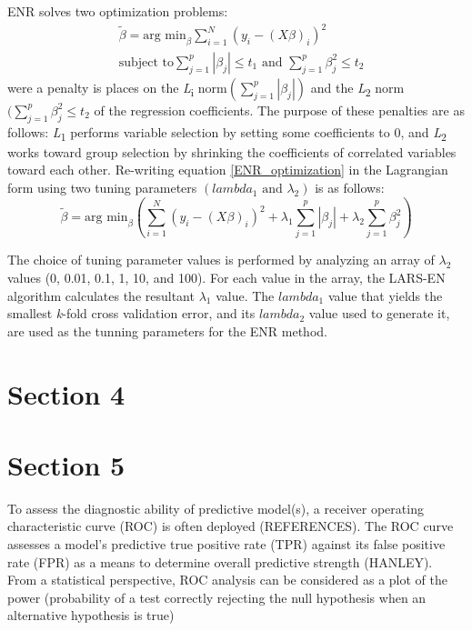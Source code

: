 ENR solves two optimization problems:
\begin{equation} \label{ENR_optimization}
\begin{aligned}
&\tilde{\beta} = \text{arg min}_\beta \sum_{i=1}^{N} (y_i - (X\beta)_i)^2 \\
&\text{subject to} \sum_{j=1}^{p} |\beta_j | \le t_1 \text{ and } \sum_{j=1}^{p} \beta_j^2 \le t_2
\end{aligned}
\end{equation}
were a penalty is places on the \textit{L}\textsubscript{i} norm$(\sum_{j=1}^{p} |\beta_j|)$ and the \textit{L}\textsubscript{2} norm $(\sum_{j=1}^{p}\beta_{j}^{2} \le t_2$ of the regression coefficients. The purpose of these penalties are as follows: \textit{L}\textsubscript{1} performs variable selection by setting some coefficients to 0, and \textit{L}\textsubscript{2} works toward group selection by shrinking the coefficients of correlated variables toward each other. Re-writing equation \ref{ENR_optimization} in the Lagrangian form using two tuning parameters $(lambda_1 \text{ and } \lambda_2)$ is as follows:
\begin{equation} \label{ENR_lagrangian}
\tilde{\beta} = \text{arg min}_\beta \left(\sum_{i=1}^{N} (y_i - (X\beta)_i)^2 + \lambda_1 \sum_{j=1}^{p} |\beta_j| + \lambda_2 \sum_{j=1}^{p} \beta_{j}^{2}\right)
\end{equation}

The choice of tuning parameter values is performed by analyzing an array of $\lambda_2$ values (0, 0.01, 0.1, 1, 10, and 100). For each value in the array, the LARS-EN algorithm calculates the resultant $\lambda_1$ value. The $lambda_1$ value that yields the smallest \textit{k}-fold cross validation error, and its $lambda_2$ value used to generate it, are used as the tunning parameters for the ENR method.


\section{Section 4}\label{Support Vector Machine}


\section{Section 5}\label{Reciever Operator Characterisitics}
To assess the diagnostic ability of predictive model(s), a receiver operating characteristic curve (ROC) is often deployed (REFERENCES). The ROC curve assesses a model's predictive true positive rate (TPR) against its false positive rate (FPR) as a means to determine overall predictive strength (HANLEY). From a statistical perspective, ROC analysis can be considered as a plot of the power (probability of a test correctly rejecting the null hypothesis when an alternative hypothesis is true) 

